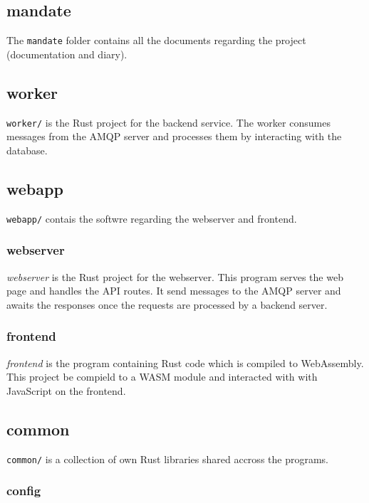 \documentclass[../documentation.tex]{subfiles}
\begin{document}
\subsection{mandate}

The \texttt{mandate} folder contains all the documents regarding
the project (documentation and diary).

\subsection{worker}

\texttt{worker/} is the Rust project for the backend service.
The worker consumes messages from the AMQP server
and processes them by interacting with the database.

\subsection{webapp}

\texttt{webapp/} contais the softwre regarding the webserver and frontend.

\subsubsection{webserver}

\textit{webserver} is the Rust project for the webserver.
This program serves the web page and handles
the API routes. It send messages to the AMQP server
and awaits the responses once the requests are processed
by a backend server.

\subsubsection{frontend}

\textit{frontend} is the program containing Rust code which is compiled to WebAssembly.
This project be compield to a WASM module and interacted with with JavaScript on the frontend.

\subsection{common}

\texttt{common/} is a collection of own Rust libraries
shared accross the programs.

\subsubsection{config}
\end{document}
